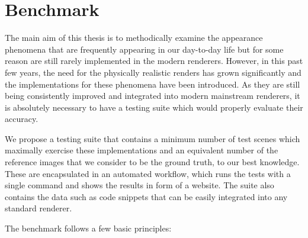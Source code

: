 \chapter{Benchmark}

The main aim of this thesis is to methodically examine the appearance phenomena that are frequently appearing in our day-to-day life but for some reason are still rarely implemented in the modern renderers. However, in this past few years, the need for the physically realistic renders has grown significantly and the implementations for these phenomena have been introduced. As they are still being consistently improved and integrated into modern mainstream renderers, it is absolutely necessary to have a testing suite which would properly evaluate their accuracy.

We propose a testing suite that contains a minimum number of test scenes which maximally exercise these implementations and an equivalent number of the reference images that we consider to be the ground truth, to our best knowledge. These are encapsulated in an automated workflow, which runs the tests with a single command and shows the results in form of a website. The suite also contains the data such as code snippets that can be easily integrated into any standard renderer.

The benchmark follows a few basic principles:

